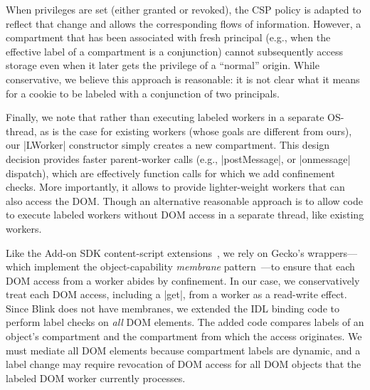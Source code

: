 When privileges are set (either granted or revoked), the CSP policy is
adapted to reflect that change and allows the corresponding flows of
information. However, a compartment that has been associated with
fresh principal (e.g., when the effective label of a compartment is a
conjunction) cannot subsequently access storage even when it later
gets the privilege of a ``normal'' origin. While conservative, we
believe this approach is reasonable: it is not clear what it means for
a cookie to be labeled with a conjunction of two principals.

%

Finally, we note that rather than executing labeled workers in a
separate OS-thread, as is the case for existing workers (whose goals
are different from ours), our \js|LWorker| constructor simply creates a new
compartment. This design decision provides 
%
faster parent-worker calls (e.g.,
\js|postMessage|, or \js|onmessage| dispatch), which are effectively function
calls for which we add confinement checks. 
%
More importantly, it allows \sys{} to provide lighter-weight workers
that can also access the DOM.
%
Though an alternative reasonable approach is to allow code to execute
labeled workers without DOM access in a separate thread, like existing
workers.
 
Like the Add-on SDK content-script extensions~\cite{addon-sdk}, we
rely on Gecko's wrappers---which implement the object-capability
\emph{membrane}
pattern~\cite{miller2003paradigm,miller2006robust}---to ensure that
each DOM access from a worker abides by confinement.
%
In our case, we conservatively treat each DOM access, including a
\js|get|, from a worker as a read-write effect.
%
Since Blink does not have membranes, we extended the IDL binding code
to perform label checks on \emph{all} DOM elements.
%
The added code compares labels of an object's compartment and the compartment
from which the access originates.
%
We must mediate all DOM elements because compartment labels are dynamic, and a
label change may require revocation of DOM access for all DOM objects that the
labeled DOM worker currently processes.



